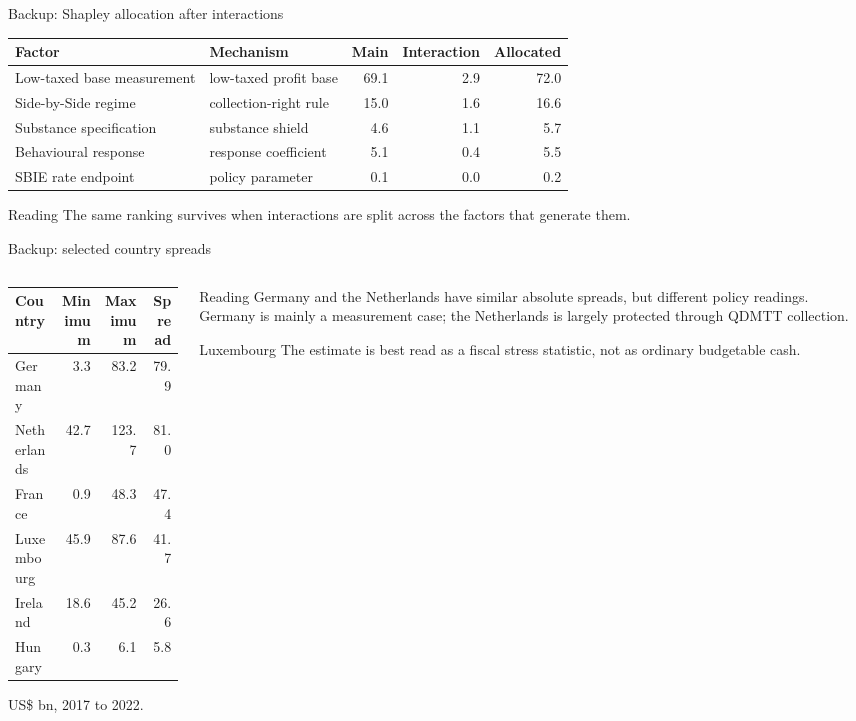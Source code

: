 \documentclass[aspectratio=169, 11pt]{beamer}
\newcommand{\sourceline}[1]{}
\begin{document}
\begin{frame}{Backup: Shapley allocation after interactions}
\small
\begin{center}
\scriptsize
\begin{tabular}{@{}L{2.8cm}L{4.0cm}rrr@{}}
  \toprule
  Factor & Mechanism & Main & Interaction & Allocated \\
  \midrule
  Low-taxed base measurement & low-taxed profit base & 69.1 & 2.9 & 72.0 \\
  Side-by-Side regime & collection-right rule & 15.0 & 1.6 & 16.6 \\
  Substance specification & substance shield & 4.6 & 1.1 & 5.7 \\
  Behavioural response & response coefficient & 5.1 & 0.4 & 5.5 \\
  SBIE rate endpoint & policy parameter & 0.1 & 0.0 & 0.2 \\
  \bottomrule
\end{tabular}
\end{center}
\begin{block}{Reading}
  The same ranking survives when interactions are split across the factors that generate them.
\end{block}
\sourceline{generated Table stage4\_6\_shapley\_factor\_attribution}
\end{frame}

\begin{frame}{Backup: selected country spreads}
\small
\begin{columns}[T]
\begin{column}{0.48\textwidth}
\begin{center}
\scriptsize
\begin{tabular}{@{}lrrr@{}}
  \toprule
  Country & Minimum & Maximum & Spread \\
  \midrule
  Germany & 3.3 & 83.2 & 79.9 \\
  Netherlands & 42.7 & 123.7 & 81.0 \\
  France & 0.9 & 48.3 & 47.4 \\
  Luxembourg & 45.9 & 87.6 & 41.7 \\
  Ireland & 18.6 & 45.2 & 26.6 \\
  Hungary & 0.3 & 6.1 & 5.8 \\
  \bottomrule
\end{tabular}
\end{center}
\tiny US\$ bn, 2017 to 2022.
\end{column}
\begin{column}{0.48\textwidth}
\begin{block}{Reading}
  Germany and the Netherlands have similar absolute spreads, but different policy readings. Germany is mainly a measurement case; the Netherlands is largely protected through QDMTT collection.
\end{block}
\begin{alertblock}{Luxembourg}
  The estimate is best read as a fiscal stress statistic, not as ordinary budgetable cash.
\end{alertblock}
\end{column}
\end{columns}
\sourceline{generated Tables country\_spread and country\_fiscal\_salience}
\end{frame}
\end{document}
